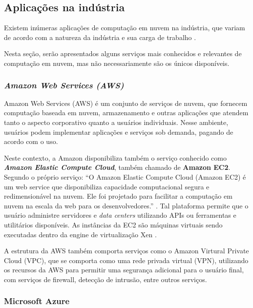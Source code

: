 \documentclass[
	12pt,				%
	openright,			%
	twoside,			%
	a4paper,			%
	english,			%
	french,				%
	spanish,			%
	brazil				%
	]{abntex2}
\begin{document}
\subsection{Aplicações na indústria}

Existem inúmeras aplicações de computação em nuvem na indústria, que variam de acordo com a natureza da indústria e sua carga de trabalho \cite[p. 10]{khan2018cloud}.

Nesta seção, serão apresentados alguns serviços mais conhecidos e relevantes de computação em nuvem, mas não necessariamente são os únicos disponíveis.

\subsubsection{\emph{Amazon Web Services (AWS)}}

Amazon Web Services (AWS) \cite{aws} é um conjunto de serviços de nuvem, que fornecem computação baseada em nuvem, armazenamento e outras aplicações que atendem tanto o aspecto corporativo quanto a usuários individuais. Nesse ambiente, usuários podem implementar aplicações e serviços sob demanda, pagando de acordo com o uso. \cite[p. 13]{zhang2010cloud}

Neste contexto, a Amazon disponibiliza também o serviço conhecido como \emph{\textbf{Amazon Elastic Compute Cloud}}, também chamado de \textbf{Amazon EC2}. Segundo o próprio serviço: ``O Amazon Elastic Compute Cloud (Amazon EC2) é um web service que disponibiliza capacidade computacional segura e redimensionável na nuvem. Ele foi projetado para facilitar a computação em nuvem na escala da web para os desenvolvedores.'' \cite{amazonec2}. Tal plataforma permite que o usuário administre servidores e \emph{data centers} utilizando APIs ou ferramentas e utilitários disponíveis. As instâncias da EC2 são máquinas virtuais sendo executadas dentro da engine de virtualização Xen \cite{xenengine} \cite{zhang2010cloud}.

A estrutura da AWS também comporta serviços como o Amazon Virtural Private Cloud (VPC), que se comporta como uma rede privada virtual (VPN), utilizando os recursos da AWS para permitir uma segurança adicional para o usuário final, com serviços de firewall, detecção de intrusão, entre outros serviços.

\subsubsection{Microsoft Azure}
\end{document}
